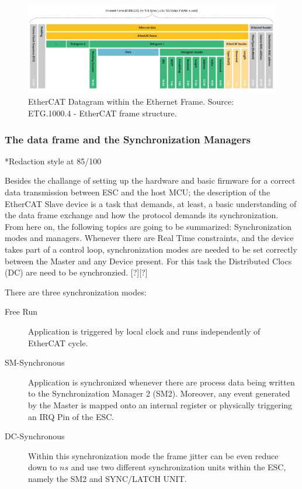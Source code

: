 \begin{figure}[ht]
    \centering
    \includegraphics[width=\textwidth]{imgs/impl-dataframe.jpg}
    \caption{EtherCAT Datagram within the Ethernet Frame. Source: ETG.1000.4 - EtherCAT frame structure.}
    \label{fig:dataframe}
\end{figure}

\subsubsection{The data frame and the Synchronization Managers}\label{sec:synch_managers}
*Redaction style at 85/100

Besides the challange of setting up the hardware and basic firmware for a correct data transmission between ESC and the host MCU; the description of the EtherCAT 
Slave device is a task that demands, at least, a basic understanding of the data frame exchange and how the protocol demands its synchronization. From here on, the following
topics are going to be summarized: Synchronization modes and managers.
Whenever there are Real Time constraints, and the device takes part of a control loop, synchronization modes are needed to be set correctly between the Master and
any Device present. For this task the Distributed Clocs (DC) are need to be synchronzied. [?][?] %

There are three synchronization modes:  
\begin{description}
    \item[Free Run] Application is triggered by local clock and runs independently of EtherCAT cycle. 
    \item[SM-Synchronous] Application is synchronized whenever there are process data being written to the Synchronization Manager 2 (SM2).
    Moreover, any event generated by the Master is mapped onto an internal register or physically triggering an IRQ Pin of the ESC. 
    \item[DC-Synchronous] Within this synchronization mode the frame jitter can be even reduce down to $ns$ and use two different synchronization
    units within the ESC, namely the SM2 and SYNC/LATCH UNIT. 
\end{description}

